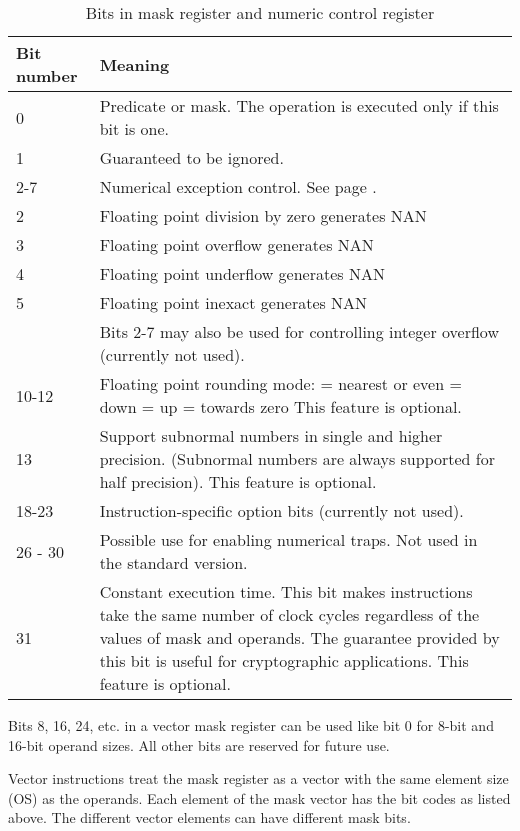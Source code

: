 \documentclass[forwardcom.tex]{subfiles}
\begin{document}
\begin{longtable}
{|p{15mm}|p{90mm}|}
\caption{Bits in mask register and numeric control register}
\label{table:maskBits}
\endfirsthead
\endhead
\hline
\bfseries Bit number & \bfseries Meaning \\
 \hline
0 & Predicate or mask. The operation is executed only if this bit is one.\\
1 & Guaranteed to be ignored. \\
\hline
2-7 & Numerical exception control. See page \pageref{table:FPExceptionResults}. \\
2 & Floating point division by zero generates NAN \\
3 & Floating point overflow generates NAN \\
4 & Floating point underflow generates NAN \\
5 & Floating point inexact generates NAN \\
  & Bits 2-7 may also be used for controlling integer overflow (currently not used).\\ \hline
10-12 & Floating point rounding mode: \newline
000 = nearest or even \newline
001 = down \newline
010 = up \newline
011 = towards zero \newline
This feature is optional.\\ \hline
13 & Support subnormal numbers in single and higher precision. 
(Subnormal numbers are always supported for half precision). This feature is optional.\\ \hline  
  
18-23 & Instruction-specific option bits (currently not used). \\
\hline
26 - 30 & Possible use for enabling numerical traps. Not used in the standard version. \\
\hline
31 & Constant execution time. This bit makes instructions take the same number of clock cycles regardless of the values of mask and operands. The guarantee provided by this bit is useful for cryptographic applications. This feature is optional. \\
\hline
\end{longtable}

Bits 8, 16, 24, etc. in a vector mask register can be used like bit 0 for 8-bit and 16-bit operand sizes. All other bits are reserved for future use.
\vv

Vector instructions treat the mask register as a vector with the same element size (OS) as the operands. Each element of the mask vector has the bit codes as listed above. The different vector elements can have different mask bits.
\vv
\end{document}
